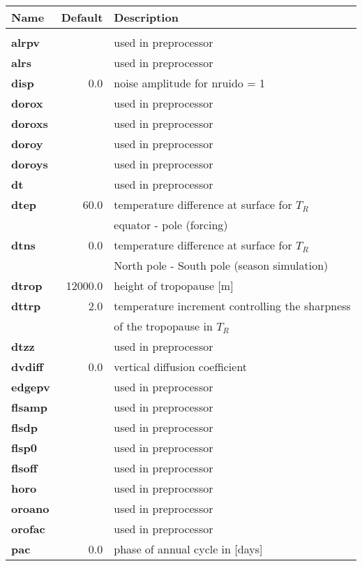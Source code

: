 \begin{tabular}{|l|r||l|}                                  
\hline
Name   & Default & Description \\
\hline
& & \\
{\bf alrpv  } &      & used in preprocessor \\
{\bf alrs   } &      & used in preprocessor \\
{\bf disp   } &  0.0 & noise amplitude for nruido = 1 \\
{\bf dorox  } &      & used in preprocessor \\
{\bf doroxs } &      & used in preprocessor \\
{\bf doroy  } &      & used in preprocessor \\
{\bf doroys } &      & used in preprocessor \\
{\bf dt     } &      & used in preprocessor \\
{\bf dtep   } & 60.0 & temperature difference at surface for $T_R$ \\
{\bf        } &      & equator - pole (forcing) \\
{\bf dtns   } &  0.0 & temperature difference at surface for $T_R$  \\ 
{\bf        } &      & North pole - South pole (season simulation) \\
{\bf dtrop  } & 12000.0 & height of tropopause [m] \\ 
{\bf dttrp  } &  2.0 & temperature increment controlling the sharpness \\ 
{\bf        } &      & of the tropopause in $T_R$ \\
{\bf dtzz   } &      & used in preprocessor \\
{\bf dvdiff } & 0.0  & vertical diffusion coefficient \\
{\bf edgepv } &      & used in preprocessor \\
{\bf flsamp } &      & used in preprocessor \\
{\bf flsdp  } &      & used in preprocessor \\
{\bf flsp0  } &      & used in preprocessor \\
{\bf flsoff } &      & used in preprocessor \\
{\bf horo   } &      & used in preprocessor \\
{\bf oroano } &      & used in preprocessor \\
{\bf orofac } &      & used in preprocessor \\
{\bf pac    } &  0.0 & phase  of annual cycle in [days] \\

\end{tabular}
